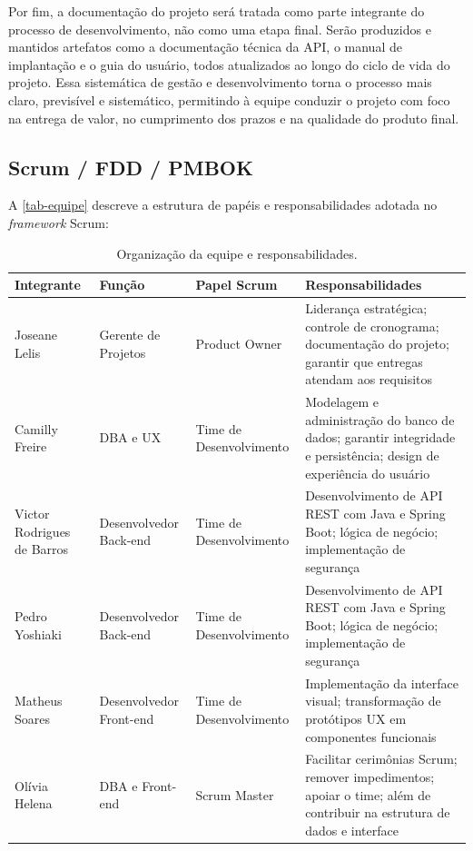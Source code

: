 Por fim, a documentação do projeto será tratada como parte integrante do processo de desenvolvimento, não como uma etapa final. Serão produzidos e mantidos artefatos como a documentação técnica da API, o manual de implantação e o guia do usuário, todos atualizados ao longo do ciclo de vida do projeto. Essa sistemática de gestão e desenvolvimento torna o processo mais claro, previsível e sistemático, permitindo à equipe conduzir o projeto com foco na entrega de valor, no cumprimento dos prazos e na qualidade do produto final.

\subsection{Scrum / FDD / PMBOK}

A \autoref{tab-equipe} descreve a estrutura de papéis e responsabilidades adotada no \textit{framework} Scrum:

\begin{table}[htb]
\ABNTEXfontereduzida
\caption[Organização da Equipe e Responsabilidades]{Organização da equipe e responsabilidades.}
\label{tab-equipe}
\begin{tabular}{p{2.5cm}|p{3cm}|p{2.8cm}|p{5.5cm}}
\textbf{Integrante} & \textbf{Função} & \textbf{Papel Scrum} & \textbf{Responsabilidades} \\
\hline
Joseane Lelis & Gerente de Projetos & Product Owner & Liderança estratégica; controle de cronograma; documentação do projeto; garantir que entregas atendam aos requisitos \\
\hline
Camilly Freire & DBA e UX & Time de Desenvolvimento & Modelagem e administração do banco de dados; garantir integridade e persistência; design de experiência do usuário \\
\hline
Victor Rodrigues de Barros & Desenvolvedor Back-end & Time de Desenvolvimento & Desenvolvimento de API REST com Java e Spring Boot; lógica de negócio; implementação de segurança \\
\hline
Pedro Yoshiaki & Desenvolvedor Back-end & Time de Desenvolvimento & Desenvolvimento de API REST com Java e Spring Boot; lógica de negócio; implementação de segurança \\
\hline
Matheus Soares & Desenvolvedor Front-end & Time de Desenvolvimento & Implementação da interface visual; transformação de protótipos UX em componentes funcionais \\
\hline
Olívia Helena & DBA e Front-end & Scrum Master & Facilitar cerimônias Scrum; remover impedimentos; apoiar o time; além de contribuir na estrutura de dados e interface \\
\end{tabular}
\end{table}


